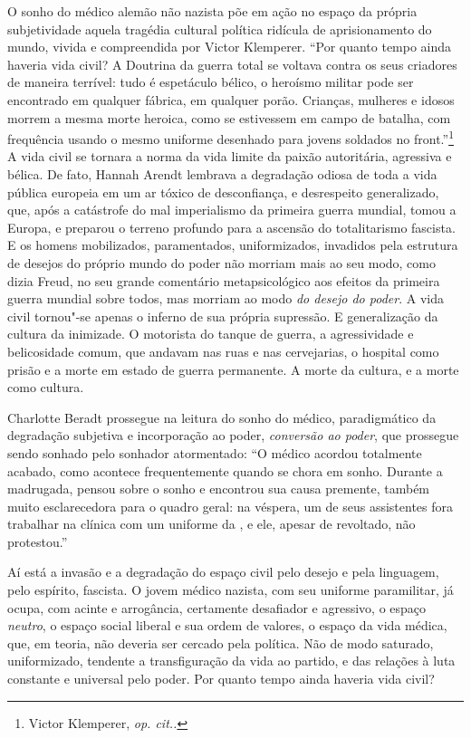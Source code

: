 O sonho do médico alemão não nazista põe em ação no espaço da própria
subjetividade aquela tragédia cultural política ridícula de
aprisionamento do mundo, vivida e compreendida por Victor Klemperer.
``Por quanto tempo ainda haveria vida civil? A Doutrina da guerra total
se voltava contra os seus criadores de maneira terrível: tudo é
espetáculo bélico, o heroísmo militar pode ser encontrado em qualquer
fábrica, em qualquer porão. Crianças, mulheres e idosos morrem a mesma
morte heroica, como se estivessem em campo de batalha, com frequência
usando o mesmo uniforme desenhado para jovens soldados no
front.''\footnote{Victor Klemperer, \emph{op. cit..}} A vida civil se
tornara a norma da vida limite da paixão autoritária, agressiva e
bélica. De fato, Hannah Arendt lembrava a degradação odiosa de toda a
vida pública europeia em um ar tóxico de desconfiança, e desrespeito
generalizado, que, após a catástrofe do mal imperialismo da primeira
guerra mundial, tomou a Europa, e preparou o terreno profundo para a
ascensão do totalitarismo fascista. E os homens mobilizados,
paramentados, uniformizados, invadidos pela estrutura de desejos do
próprio mundo do poder não morriam mais ao seu modo, como dizia Freud,
no seu grande comentário metapsicológico aos efeitos da primeira guerra
mundial sobre todos, mas morriam ao modo \emph{do desejo do poder}. A
vida civil tornou"-se apenas o inferno de sua própria supressão. E
generalização da cultura da inimizade. O motorista do tanque de guerra,
a agressividade e belicosidade comum, que andavam nas ruas e nas
cervejarias, o hospital como prisão e a morte em estado de guerra
permanente. A morte da cultura, e a morte como cultura.

Charlotte Beradt prossegue na leitura do sonho do médico, paradigmático
da degradação subjetiva e incorporação ao poder, \emph{conversão ao
poder}, que prossegue sendo sonhado pelo sonhador atormentado: ``O
médico acordou totalmente acabado, como acontece frequentemente quando
se chora em sonho. Durante a madrugada, pensou sobre o sonho e encontrou
sua causa premente, também muito esclarecedora para o quadro geral: na
véspera, um de seus assistentes fora trabalhar na clínica com um
uniforme da , e ele, apesar de revoltado, não protestou.''

Aí está a invasão e a degradação do espaço civil pelo desejo e pela
linguagem, pelo espírito, fascista. O jovem médico nazista, com seu
uniforme paramilitar, já ocupa, com acinte e arrogância, certamente
desafiador e agressivo, o espaço \emph{neutro}, o espaço social liberal
e sua ordem de valores, o espaço da vida médica, que, em teoria, não
deveria ser cercado pela política. Não de modo saturado, uniformizado,
tendente a transfiguração da vida ao partido, e das relações à luta
constante e universal pelo poder. Por quanto tempo ainda haveria vida
civil?

